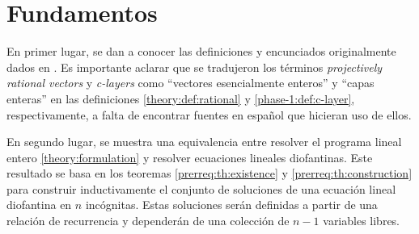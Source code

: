 \newpage
\begin{algorithm}[H]
	\LinesNumbered
	\DontPrintSemicolon
	\caption{Ramificación y Acotamiento. Adaptado de \cite{fabs}.}
	\label{algo:bb2}
\end{algorithm}

\section{Fundamentos}
\label{sec:foundations}
\noindent
En primer lugar, se dan a conocer las definiciones y encunciados originalmente dados en \cite{herr}.
Es importante aclarar que se tradujeron los términos \textit{projectively rational
vectors} y \textit{c-layers} como ``vectores esencialmente enteros'' y ``capas enteras'' en las
definiciones \ref{theory:def:rational} y \ref{phase-1:def:c-layer}, respectivamente, a falta de
encontrar fuentes en español que hicieran uso de ellos.

En segundo lugar, se muestra una equivalencia entre resolver el programa lineal entero
\eqref{theory:formulation} y resolver ecuaciones lineales diofantinas. Este resultado se basa en los
teoremas \ref{prerreq:th:existence} y \ref{prerreq:th:construction} para construir inductivamente el
conjunto de soluciones de una ecuación lineal diofantina en $n$ incógnitas. Estas soluciones serán
definidas a partir de una relación de recurrencia y dependerán de una colección de $n - 1$
variables libres.

